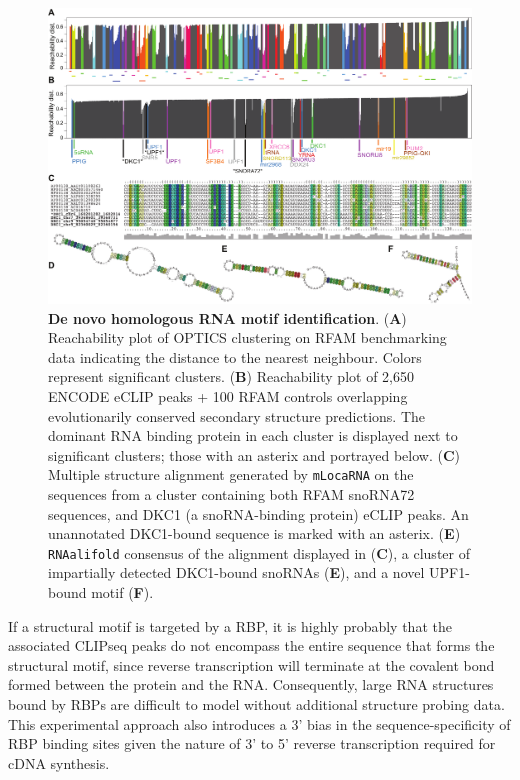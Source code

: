 \documentclass[a4paper,11pt]{article}
\begin{document}
  \begin{figure}
 \includegraphics[width=\textwidth]{fig5}
 \caption { \textbf{ De novo homologous RNA motif identification}. 
 (\textbf{A}) Reachability plot of OPTICS clustering on RFAM benchmarking data indicating the distance to the nearest neighbour. Colors represent 
 significant clusters. 
 (\textbf{B}) Reachability plot of 2,650 ENCODE eCLIP peaks + 100 RFAM controls overlapping evolutionarily conserved secondary structure predictions. The dominant RNA binding protein 
 in each cluster is displayed next to significant clusters; those with an asterix and portrayed below.
 (\textbf{C}) Multiple structure alignment generated by \texttt{mLocaRNA} on the sequences from a 
 cluster containing both RFAM snoRNA72 sequences, and DKC1 (a snoRNA-binding protein) eCLIP peaks. 
An unannotated DKC1-bound sequence is marked with an asterix.
(\textbf{E}) \texttt{RNAalifold} consensus of the alignment displayed in (\textbf{C}), 
a cluster of impartially detected DKC1-bound snoRNAs (\textbf{E}), 
and a novel UPF1-bound motif (\textbf{F}). }
\end{figure}

If a structural motif is targeted by a RBP, it is highly probably that the associated CLIPseq peaks 
do not encompass the entire sequence that forms the structural motif, since 
reverse transcription will terminate at the covalent bond formed between the 
protein and the RNA. Consequently, large RNA structures bound by RBPs are 
difficult to model without additional structure probing data. This experimental 
approach also introduces a 3' bias in the sequence-specificity of RBP binding sites 
given the nature of 3' to 5' reverse transcription required for cDNA synthesis.\\
\end{document}
